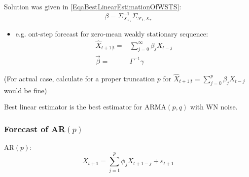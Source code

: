    Solution was given in \autoref{EqaBestLinearEstimationOfWSTS}:
    \begin{equation}
        \beta =\Sigma _{X_{\mathscr{F}_t}}^{-1}\Sigma _{\mathscr{F}_t,X_{\tau}}
    \end{equation}

    \begin{itemize}[topsep=2pt,itemsep=0pt]
        \item e.g. ont-step forecast for zero-mean weakly stationary sequence:
    \begin{align}
        \hat{X}_{t+1|t}=&\sum_{j=0}^\infty \beta _jX_{t-j}\\
        \vec{\beta }=&\Gamma^{-1}\gamma 
    \end{align}
    \end{itemize}
    
    (For actual case, calculate for a proper truncation $ p $ for $ \hat{X}_{t+1|t}=\sum_{j=0}^p\beta _jX_{t-j} $ would be fine)
        
    

    Best linear estimator is the best estimator for ARMA$ (p,q) $ with WN noise.


    
    
\subsubsection{Forecast of AR$ (p) $}
    AR$ (p) $:
    \begin{equation}
        X_{t+1}=\sum_{j=1}^p\phi _jX_{t+1-j}+\varepsilon _{t+1}
    \end{equation}
    
